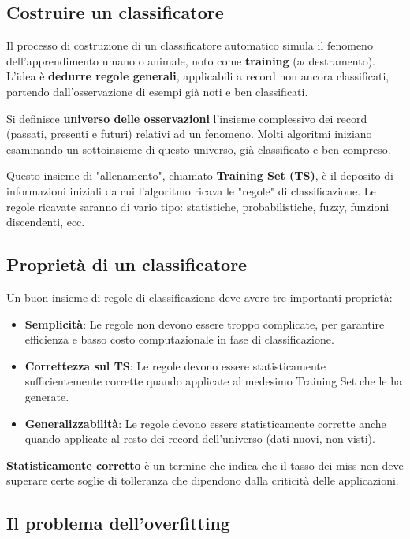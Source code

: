 \subsection{Costruire un classificatore}

Il processo di costruzione di un classificatore automatico simula
il fenomeno dell'apprendimento umano o animale, noto come
\textbf{training} (addestramento). L'idea è \textbf{dedurre regole
generali}, applicabili a record non ancora classificati,
partendo dall'osservazione di esempi già noti e ben classificati.

Si definisce \textbf{universo delle osservazioni} l'insieme
complessivo dei record (passati, presenti e futuri) relativi ad un fenomeno.
Molti algoritmi iniziano esaminando un sottoinsieme di questo
universo, già classificato e ben compreso.

Questo insieme di "allenamento", chiamato \textbf{Training Set (TS)},
è il deposito di informazioni iniziali da cui l'algoritmo
ricava le "regole" di classificazione. Le regole ricavate saranno di vario
tipo: statistiche, probabilistiche, fuzzy, funzioni discendenti, ecc.

\subsection{Proprietà di un classificatore}

Un buon insieme di regole di classificazione deve avere tre
importanti proprietà:
\begin{itemize}
    \item \textbf{Semplicità}: Le regole non devono essere troppo
    complicate, per garantire efficienza e basso costo computazionale
    in fase di classificazione.
    \item \textbf{Correttezza sul TS}: Le regole devono essere
    statisticamente sufficientemente corrette quando applicate
    al medesimo Training Set che le ha generate.
    \item \textbf{Generalizzabilità}: Le regole devono essere
    statisticamente corrette anche quando applicate al resto
    dei record dell'universo (dati nuovi, non visti).
\end{itemize}

\textbf{Statisticamente corretto} è un termine che indica che il tasso dei
miss non deve superare certe soglie di tolleranza che dipendono
dalla criticità delle applicazioni.

\subsection{Il problema dell'overfitting}

